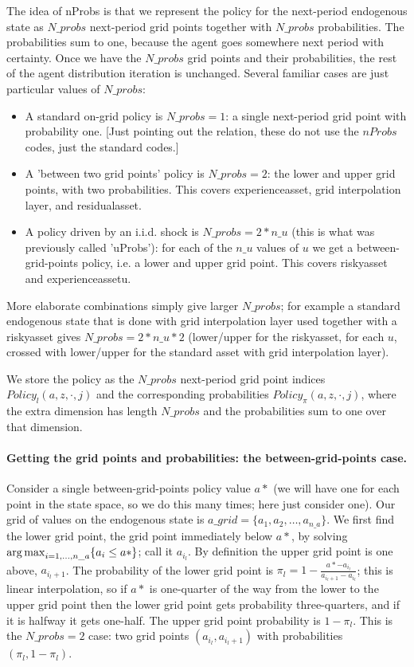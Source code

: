The idea of nProbs is that we represent the policy for the next-period endogenous state as $N\_{}probs$ next-period grid points together with $N\_{}probs$ probabilities. The probabilities sum to one, because the agent goes somewhere next period with certainty. Once we have the $N\_{}probs$ grid points and their probabilities, the rest of the agent distribution iteration is unchanged. Several familiar cases are just particular values of $N\_{}probs$:
\begin{itemize}
\item A standard on-grid policy is $N\_{}probs=1$: a single next-period grid point with probability one. [Just pointing out the relation, these do not use the $nProbs$ codes, just the standard codes.]
\item A 'between two grid points' policy is $N\_{}probs=2$: the lower and upper grid points, with two probabilities. This covers experienceasset, grid interpolation layer, and residualasset.
\item A policy driven by an i.i.d. shock is $N\_{}probs=2*n\_{}u$ (this is what was previously called 'uProbs'): for each of the $n\_{}u$ values of $u$ we get a between-grid-points policy, i.e. a lower and upper grid point. This covers riskyasset and experienceassetu.
\end{itemize}
More elaborate combinations simply give larger $N\_{}probs$; for example a standard endogenous state that is done with grid interpolation layer used together with a riskyasset gives $N\_{}probs=2*n\_{}u*2$ (lower/upper for the riskyasset, for each $u$, crossed with lower/upper for the standard asset with grid interpolation layer).

We store the policy as the $N\_{}probs$ next-period grid point indices $Policy_{l}(a,z,\cdot,j)$ and the corresponding probabilities $Policy_{\pi}(a,z,\cdot,j)$, where the extra dimension has length $N\_{}probs$ and the probabilities sum to one over that dimension.

\paragraph{Getting the grid points and probabilities: the between-grid-points case.}
Consider a single between-grid-points policy value $a*$ (we will have one for each point in the state space, so we do this many times; here just consider one). Our grid of values on the endogenous state is $a\_{}grid=\{a_1,a_2,\dots, a_{n\_{}a}\}$. We first find the lower grid point, the grid point immediately below $a*$, by solving $\operatorname*{arg\,max}_{i=1,\dots,n\_{}a} \{a_i\leq a*\}$; call it $a_{i_l}$. By definition the upper grid point is one above, $a_{i_l+1}$. The probability of the lower grid point is $\pi_{l}=1-\frac{a*-a_{i_l}}{a_{i_l+1}-a_{i_l}}$; this is linear interpolation, so if $a*$ is one-quarter of the way from the lower to the upper grid point then the lower grid point gets probability three-quarters, and if it is halfway it gets one-half. The upper grid point probability is $1-\pi_{l}$. This is the $N\_{}probs=2$ case: two grid points $(a_{i_l},a_{i_l+1})$ with probabilities $(\pi_{l},1-\pi_{l})$.

